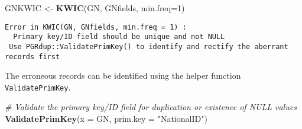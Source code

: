 \documentclass[
]{article}
\newenvironment{Shaded}{\begin{snugshade}}{\end{snugshade}}
\newcommand{\CommentTok}[1]{\textcolor[rgb]{0.56,0.35,0.01}{\textit{#1}}}
\newcommand{\DataTypeTok}[1]{\textcolor[rgb]{0.13,0.29,0.53}{#1}}
\newcommand{\DecValTok}[1]{\textcolor[rgb]{0.00,0.00,0.81}{#1}}
\newcommand{\KeywordTok}[1]{\textcolor[rgb]{0.13,0.29,0.53}{\textbf{#1}}}
\newcommand{\NormalTok}[1]{#1}
\newcommand{\StringTok}[1]{\textcolor[rgb]{0.31,0.60,0.02}{#1}}
\begin{document}
\begin{Shaded}
\begin{Highlighting}[]
\NormalTok{GNKWIC <-}\StringTok{ }\KeywordTok{KWIC}\NormalTok{(GN, GNfields, }\DataTypeTok{min.freq=}\DecValTok{1}\NormalTok{)}
\end{Highlighting}
\end{Shaded}

\begin{verbatim}
Error in KWIC(GN, GNfields, min.freq = 1) :
  Primary key/ID field should be unique and not NULL
 Use PGRdup::ValidatePrimKey() to identify and rectify the aberrant records first
\end{verbatim}

The erroneous records can be identified using the helper function
\texttt{ValidatePrimKey}.

\begin{Shaded}
\begin{Highlighting}[]
\CommentTok{# Validate the primary key/ID field for duplication or existence of NULL values}
\KeywordTok{ValidatePrimKey}\NormalTok{(}\DataTypeTok{x =}\NormalTok{ GN, }\DataTypeTok{prim.key =} \StringTok{"NationalID"}\NormalTok{)}
\end{Highlighting}
\end{Shaded}
\end{document}

